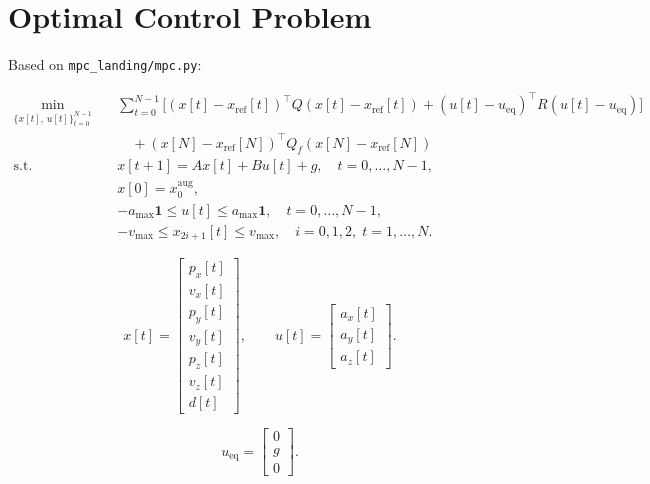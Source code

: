 \documentclass[12pt,a4paper]{article}
\title{}
\author{}
\date{}
\begin{document}
\doublespacing
\maketitle

\section{Optimal Control Problem}

Based on \texttt{mpc\_landing/mpc.py}:

\begin{equation}
\begin{aligned}
\min_{\{x[t],\,u[t]\}_{t=0}^{N-1}} \quad 
& \sum_{t=0}^{N-1} \Big[
(x[t]-x_{\mathrm{ref}}[t])^\top Q (x[t]-x_{\mathrm{ref}}[t])
+ (u[t]-u_{\mathrm{eq}})^\top R (u[t]-u_{\mathrm{eq}})
\Big] \\
& \quad + (x[N]-x_{\mathrm{ref}}[N])^\top Q_f (x[N]-x_{\mathrm{ref}}[N]) \\
\text{s.t.} \quad
& x[t+1] = A x[t] + B u[t] + g, \quad t = 0,\dots,N-1, \\
& x[0] = x_0^{\mathrm{aug}}, \\
& -a_{\max}\mathbf{1} \le u[t] \le a_{\max}\mathbf{1}, \quad t = 0,\dots,N-1, \\
& -v_{\max} \le x_{2i+1}[t] \le v_{\max}, \quad i=0,1,2,\; t = 1,\dots,N.
\end{aligned}
\end{equation}

\begin{equation}
x[t] =
\begin{bmatrix}
p_x[t] \\ v_x[t] \\ p_y[t] \\ v_y[t] \\ p_z[t] \\ v_z[t] \\ d[t]
\end{bmatrix},
\qquad
u[t] =
\begin{bmatrix}
a_x[t] \\ a_y[t] \\ a_z[t]
\end{bmatrix}.
\end{equation}

\begin{equation}
u_{\mathrm{eq}} =
\begin{bmatrix}
0 \\ g \\ 0
\end{bmatrix}.
\end{equation}
\end{document}
